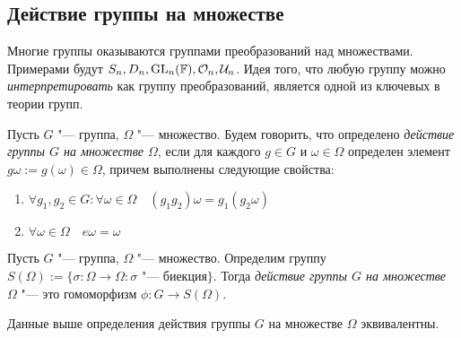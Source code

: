 \subsection{Действие группы на множестве}

\begin{note}
	Многие группы оказываются группами преобразований над множествами. Примерами будут $S_n, D_n, \operatorname{GL}_n(\mathbb{F}), \mathcal{O}_n, \mathcal{U}_n$. Идея того, что любую группу можно \textit{интерпретировать} как группу преобразований, является одной из ключевых в теории групп.
\end{note}

\begin{definition}
	Пусть $G$ "--- группа, $\Omega$ "--- множество. Будем говорить, что определено \textit{действие группы $G$ на множестве $\Omega$}, если для каждого $g \in G$ и $\omega \in \Omega$ определен элемент $g\omega := g(\omega) \in \Omega$, причем выполнены следующие свойства:
	\begin{enumerate}
		\item $\forall g_1, g_2 \in G: \forall \omega \in \Omega \quad (g_1g_2)\omega = g_1(g_2\omega)$
		\item $\forall \omega \in \Omega \quad e\omega = \omega$
	\end{enumerate}
\end{definition}

\begin{definition}
	Пусть $G$ "--- группа, $\Omega$ "--- множество. Определим группу $S(\Omega) := \{\sigma: \Omega \to \Omega: \sigma\text{ "--- биекция}\}$. Тогда \textit{действие группы $G$ на множестве $\Omega$} "--- это гомоморфизм $\phi: G \to S(\Omega)$.
\end{definition}

\begin{proposition}
	Данные выше определения действия группы $G$ на множестве $\Omega$ эквивалентны.
\end{proposition}

